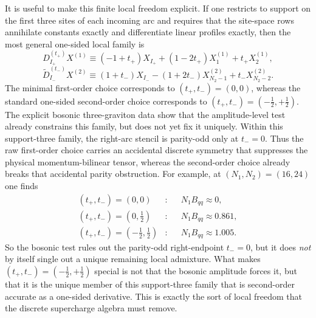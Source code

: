 \documentclass[11pt]{article}
\numberwithin{equation}{section}
\begin{document}
It is useful to make this finite local freedom explicit. If one restricts to support on the first three sites of each incoming arc and requires that the site-space rows annihilate constants exactly and differentiate linear profiles exactly, then the most general one-sided local family is
\begin{equation}
\label{eq:s15-1-032}
D^{(t_+)}_{I_+}X^{(1)}
\equiv
(-1+t_+)X_{I_+}
+(1-2t_+)X_1^{(1)}
+t_+X_2^{(1)},
\end{equation}
\begin{equation}
\label{eq:s15-1-033}
\widetilde D^{(t_-)}_{I_-}X^{(2)}
\equiv
(1+t_-)X_{I_-}
-(1+2t_-)X_{N_2-1}^{(2)}
+t_-X_{N_2-2}^{(2)}.
\end{equation}
The minimal first-order choice corresponds to $(t_+,t_-)=(0,0)$, whereas the standard one-sided second-order choice corresponds to $(t_+,t_-)=(-\frac12,+\frac12)$. The explicit bosonic three-graviton data show that the amplitude-level test already constrains this family, but does not yet fix it uniquely. Within this support-three family, the right-arc stencil is parity-odd only at $t_-=0$. Thus the raw first-order choice carries an accidental discrete symmetry that suppresses the physical momentum-bilinear tensor, whereas the second-order choice already breaks that accidental parity obstruction. For example, at $(N_1,N_2)=(16,24)$ one finds
\begin{equation}
\label{eq:s15-1-034}
\begin{aligned}
(t_+,t_-)=(0,0)&:
&&N_1B_{qq}\approx 0,\\
(t_+,t_-)=(0,\tfrac12)&:
&&N_1B_{qq}\approx 0.861,\\
(t_+,t_-)=(-\tfrac12,\tfrac12)&:
&&N_1B_{qq}\approx 1.005.
\end{aligned}
\end{equation}
So the bosonic test rules out the parity-odd right-endpoint $t_-=0$, but it does \emph{not} by itself single out a unique remaining local admixture. What makes $(t_+,t_-)=(-\frac12,+\frac12)$ special is not that the bosonic amplitude forces it, but that it is the unique member of this support-three family that is second-order accurate as a one-sided derivative. This is exactly the sort of local freedom that the discrete supercharge algebra must remove.
\end{document}
